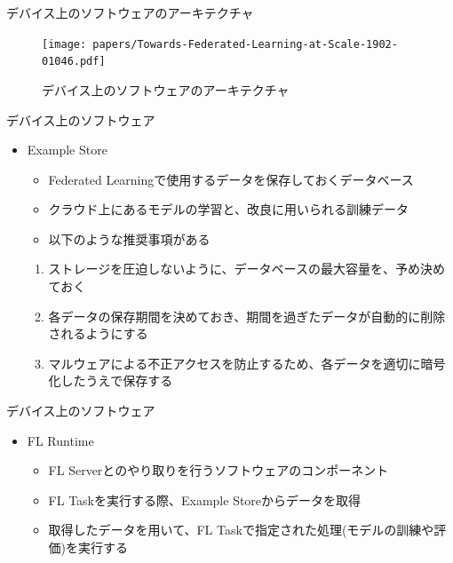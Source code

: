 \documentclass[dvipdfmx,notheorems,t]{beamer}
\begin{document}
\begin{frame}{デバイス上のソフトウェアのアーキテクチャ}

\begin{figure}
	\centering
	\texttt{[image: papers/Towards-Federated-Learning-at-Scale-1902-01046.pdf]}
	\caption{デバイス上のソフトウェアのアーキテクチャ~\cite{1902.01046}}
	\label{fig:fl-device-arch}
\end{figure}

\end{frame}

\begin{frame}{デバイス上のソフトウェア}

\begin{itemize}
	\item \alert{Example Store}
	\begin{itemize}
		\item Federated Learningで使用するデータを保存しておくデータベース
		\item クラウド上にあるモデルの学習と、改良に用いられる訓練データ
		\newline
		
		\item 以下のような推奨事項がある
	\end{itemize}
	
	\begin{enumerate}
		\item ストレージを圧迫しないように、データベースの最大容量を、予め決めておく
		\item 各データの保存期間を決めておき、期間を過ぎたデータが自動的に削除されるようにする
		\item マルウェアによる不正アクセスを防止するため、各データを適切に暗号化したうえで保存する
	\end{enumerate}
\end{itemize}

\end{frame}

\begin{frame}{デバイス上のソフトウェア}

\begin{itemize}
	\item \alert{FL Runtime}
	\begin{itemize}
		\item FL Serverとのやり取りを行うソフトウェアのコンポーネント
		\newline
		
		\item FL Taskを実行する際、Example Storeからデータを取得
		\item 取得したデータを用いて、FL Taskで指定された処理(モデルの訓練や評価)を実行する
	\end{itemize}
\end{itemize}

\end{frame}
\end{document}
